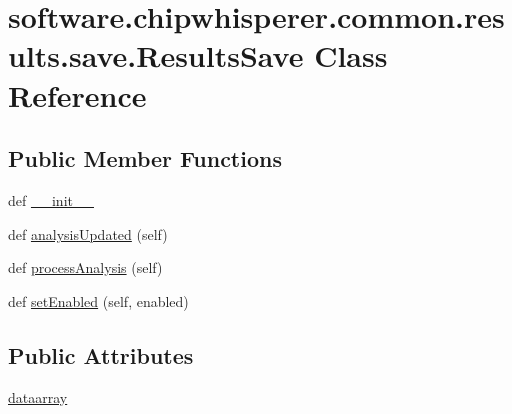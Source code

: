 \hypertarget{classsoftware_1_1chipwhisperer_1_1common_1_1results_1_1save_1_1ResultsSave}{}\section{software.\+chipwhisperer.\+common.\+results.\+save.\+Results\+Save Class Reference}
\label{classsoftware_1_1chipwhisperer_1_1common_1_1results_1_1save_1_1ResultsSave}
\subsection*{Public Member Functions}
\begin{DoxyCompactItemize}
\item 
def \hyperlink{classsoftware_1_1chipwhisperer_1_1common_1_1results_1_1save_1_1ResultsSave_a1a04696aba8890ac76be86c7cc40895d}{\+\_\+\+\_\+init\+\_\+\+\_\+}
\item 
def \hyperlink{classsoftware_1_1chipwhisperer_1_1common_1_1results_1_1save_1_1ResultsSave_af085523ae618bb17e3f82411c7a26496}{analysis\+Updated} (self)
\item 
def \hyperlink{classsoftware_1_1chipwhisperer_1_1common_1_1results_1_1save_1_1ResultsSave_ae45d6f987a479e7e27aa070759899042}{process\+Analysis} (self)
\item 
def \hyperlink{classsoftware_1_1chipwhisperer_1_1common_1_1results_1_1save_1_1ResultsSave_aeea37dece50414d5283dfc93c86c1328}{set\+Enabled} (self, enabled)
\end{DoxyCompactItemize}
\subsection*{Public Attributes}
\begin{DoxyCompactItemize}
\item 
\hyperlink{classsoftware_1_1chipwhisperer_1_1common_1_1results_1_1save_1_1ResultsSave_a8c2555db9c212b301a0974d00ae76b8b}{dataarray}
\end{DoxyCompactItemize}


